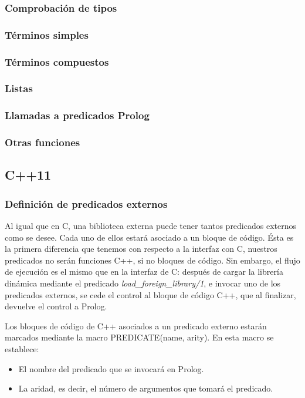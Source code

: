 \documentclass[a4paper,12pt]{article}
\begin{document}
\subsubsection{Comprobación de tipos}
\subsubsection{Términos simples}
\subsubsection{Términos compuestos}
\subsubsection{Listas}
\subsubsection{Llamadas a predicados Prolog}
\subsubsection{Otras funciones}


\subsection{C++11}
\subsubsection{Definición de predicados externos}
Al igual que en C, una biblioteca externa puede tener tantos predicados externos como se desee. Cada uno de ellos estará asociado a un bloque de código. Ésta es la primera diferencia que tenemos con respecto a la interfaz con C, nuestros predicados no serán funciones C++, si no bloques de código. Sin embargo, el flujo de ejecución es el mismo que en la interfaz de C: después de cargar la librería dinámica mediante el predicado \textit{load\_foreign\_library/1}, e invocar uno de los predicados externos, se cede el control al bloque de código C++, que al finalizar, devuelve el control a Prolog.

Los bloques de código de C++ asociados a un predicado externo estarán marcados mediante la macro PREDICATE(name, arity). En esta macro se establece:

\begin{itemize}
\item El nombre del predicado que se invocará en Prolog.
\item La aridad, es decir, el número de argumentos que tomará el predicado.
\end{itemize}
\end{document}

